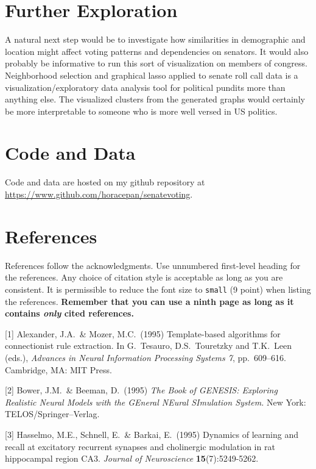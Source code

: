 \documentclass{article}
\begin{document}
\section{Further Exploration}
A natural next step would be to investigate how similarities in demographic and location might affect voting patterns and dependencies on senators. It would also probably be
informative to run this sort of visualization on members of congress. Neighborhood selection and graphical lasso applied to senate roll call data is a visualization/exploratory
data analysis tool for political pundits more than anything else. The visualized clusters from the generated graphs would certainly be more interpretable to someone who is more well versed in US politics.
\section{Code and Data}
Code and data are hosted on my github repository at \href{https://www.github.com/horacepan/senatevoting}{https://www.github.com/horacepan/senatevoting}.
\section*{References}
References follow the acknowledgments. Use unnumbered first-level
heading for the references. Any choice of citation style is acceptable
as long as you are consistent. It is permissible to reduce the font
size to \verb+small+ (9 point) when listing the references. {\bf
  Remember that you can use a ninth page as long as it contains
  \emph{only} cited references.}
\medskip

\small

[1] Alexander, J.A.\ \& Mozer, M.C.\ (1995) Template-based algorithms
for connectionist rule extraction. In G.\ Tesauro, D.S.\ Touretzky and
T.K.\ Leen (eds.), {\it Advances in Neural Information Processing
  Systems 7}, pp.\ 609--616. Cambridge, MA: MIT Press.

[2] Bower, J.M.\ \& Beeman, D.\ (1995) {\it The Book of GENESIS:
  Exploring Realistic Neural Models with the GEneral NEural SImulation
  System.}  New York: TELOS/Springer--Verlag.

[3] Hasselmo, M.E., Schnell, E.\ \& Barkai, E.\ (1995) Dynamics of
learning and recall at excitatory recurrent synapses and cholinergic
modulation in rat hippocampal region CA3. {\it Journal of
  Neuroscience} {\bf 15}(7):5249-5262.
\end{document}

